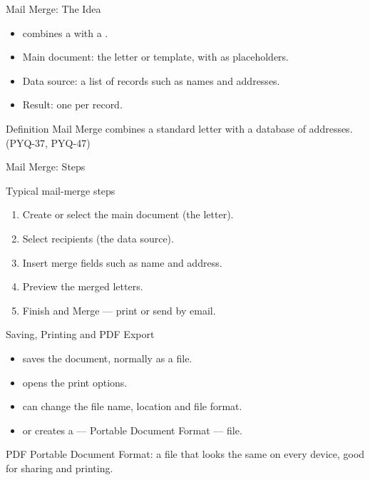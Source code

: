 \documentclass[aspectratio=169]{beamer}
\begin{document}
\begin{frame}{Mail Merge: The Idea}
  \begin{itemize}
    \item {} combines a  with a
      .
    \item Main document: the letter or template, with  as
      placeholders.
    \item Data source: a list of records such as names and addresses.
    \item Result: one  per record.
  \end{itemize}
  \begin{block}{Definition}
    Mail Merge combines a standard letter with a database of addresses.
    (PYQ-37, PYQ-47)
  \end{block}
\end{frame}

\begin{frame}{Mail Merge: Steps}
  \begin{exampleblock}{Typical mail-merge steps}
    \begin{enumerate}
      \item Create or select the main document (the letter).
      \item Select recipients (the data source).
      \item Insert merge fields such as name and address.
      \item Preview the merged letters.
      \item Finish and Merge --- print or send by email.
    \end{enumerate}
  \end{exampleblock}
\end{frame}

\begin{frame}{Saving, Printing and PDF Export}
  \begin{itemize}
    \item {} saves the document, normally as a  file.
    \item {} opens the print options.
    \item {} can change the file name, location and file format.
    \item {} or  creates a
       --- Portable Document Format --- file.
  \end{itemize}
  \begin{block}{PDF}
    Portable Document Format: a  file that looks the same on
    every device, good for sharing and printing.
  \end{block}
\end{frame}
\end{document}
